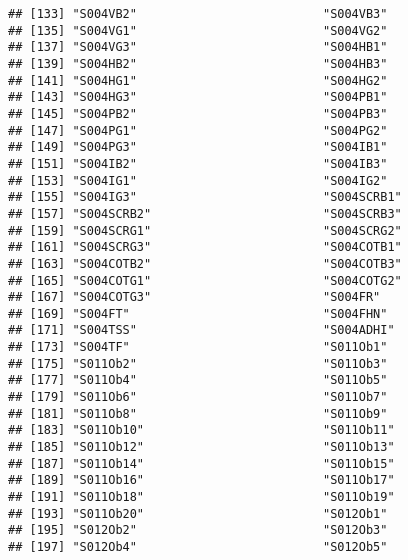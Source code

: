 \documentclass[
]{article}
\begin{document}
\begin{verbatim}
## [133] "S004VB2"                          "S004VB3"                         
## [135] "S004VG1"                          "S004VG2"                         
## [137] "S004VG3"                          "S004HB1"                         
## [139] "S004HB2"                          "S004HB3"                         
## [141] "S004HG1"                          "S004HG2"                         
## [143] "S004HG3"                          "S004PB1"                         
## [145] "S004PB2"                          "S004PB3"                         
## [147] "S004PG1"                          "S004PG2"                         
## [149] "S004PG3"                          "S004IB1"                         
## [151] "S004IB2"                          "S004IB3"                         
## [153] "S004IG1"                          "S004IG2"                         
## [155] "S004IG3"                          "S004SCRB1"                       
## [157] "S004SCRB2"                        "S004SCRB3"                       
## [159] "S004SCRG1"                        "S004SCRG2"                       
## [161] "S004SCRG3"                        "S004COTB1"                       
## [163] "S004COTB2"                        "S004COTB3"                       
## [165] "S004COTG1"                        "S004COTG2"                       
## [167] "S004COTG3"                        "S004FR"                          
## [169] "S004FT"                           "S004FHN"                         
## [171] "S004TSS"                          "S004ADHI"                        
## [173] "S004TF"                           "S011Ob1"                         
## [175] "S011Ob2"                          "S011Ob3"                         
## [177] "S011Ob4"                          "S011Ob5"                         
## [179] "S011Ob6"                          "S011Ob7"                         
## [181] "S011Ob8"                          "S011Ob9"                         
## [183] "S011Ob10"                         "S011Ob11"                        
## [185] "S011Ob12"                         "S011Ob13"                        
## [187] "S011Ob14"                         "S011Ob15"                        
## [189] "S011Ob16"                         "S011Ob17"                        
## [191] "S011Ob18"                         "S011Ob19"                        
## [193] "S011Ob20"                         "S012Ob1"                         
## [195] "S012Ob2"                          "S012Ob3"                         
## [197] "S012Ob4"                          "S012Ob5"                         

\end{verbatim}
\end{document}
